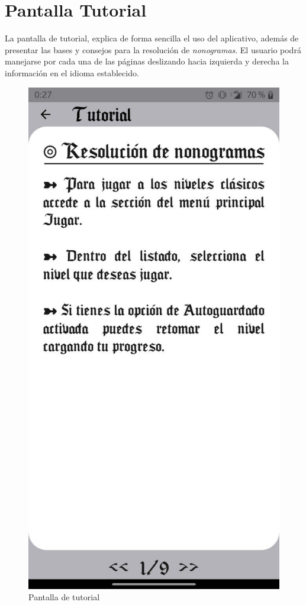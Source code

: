   \section{Pantalla Tutorial}
La pantalla de tutorial, explica de forma sencilla el uso del aplicativo,
además de presentar las bases y consejos para la resolución de \textit{nonogramas}.
El usuario podrá manejarse por cada una de las páginas deslizando hacia izquierda
y derecha la información en el idioma establecido.

\begin{figure}[H]
    \centering
    \includegraphics[scale=.3]{images/man5.jpeg}
    \caption{Pantalla de tutorial}
    \label{fig:man3}
  \end{figure}

